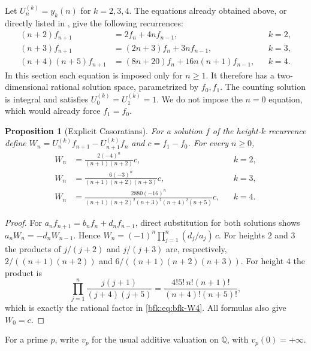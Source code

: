 \documentclass[11pt,a4paper]{article}
\newtheorem{proposition}[theorem]{Proposition}
\theoremstyle{definition}
\theoremstyle{remark}
\numberwithin{equation}{section}
\newcommand{\Q}{\mathbb{Q}}
\begin{document}
Let $U^{(k)}_n=y_k(n)$ for $k=2,3,4$. The equations already obtained above,
or directly listed in \cite{BG00}, give the following recurrences:
\begin{align}
 (n+2)f_{n+1}&=2f_n+4nf_{n-1}, && k=2,\label{bfk:eq:bfk-height2}\\
 (n+3)f_{n+1}&=(2n+3)f_n+3nf_{n-1}, && k=3,\label{bfk:eq:bfk-height3}\\
 (n+4)(n+5)f_{n+1}&=(8n+20)f_n+16n(n+1)f_{n-1},
 && k=4.\label{bfk:eq:bfk-height4}
\end{align}
In this section each equation is imposed only for $n\ge1$.
It therefore has a two-dimensional rational solution space, parametrized by
$f_0,f_1$. The counting solution is integral and satisfies
$U^{(k)}_0=U^{(k)}_1=1$. We do not impose the $n=0$ equation, which would
already force $f_1=f_0$.

\begin{proposition}[Explicit Casoratians]\label{bfk:prop:bfk-casoratians}
For a solution $f$ of the height-$k$ recurrence define
$W_n=U^{(k)}_nf_{n+1}-U^{(k)}_{n+1}f_n$ and $c=f_1-f_0$.
For every $n\ge0$,
\begin{align}
 W_n&=\frac{2(-4)^n}{(n+1)(n+2)}c, && k=2,\label{bfk:eq:bfk-W2}\\
 W_n&=\frac{6(-3)^n}{(n+1)(n+2)(n+3)}c, && k=3,\label{bfk:eq:bfk-W3}\\
 W_n&=\frac{2880(-16)^n}{(n+1)(n+2)^2(n+3)^2(n+4)^2(n+5)}c,
 && k=4.\label{bfk:eq:bfk-W4}
\end{align}
\end{proposition}
\begin{proof}
For $a_nf_{n+1}=b_nf_n+d_nf_{n-1}$, direct substitution for both solutions
shows $a_nW_n=-d_nW_{n-1}$. Hence
$W_n=(-1)^n\prod_{j=1}^n(d_j/a_j)\,c$.
For heights $2$ and $3$ the products of $j/(j+2)$ and $j/(j+3)$
are, respectively, $2/((n+1)(n+2))$ and
$6/((n+1)(n+2)(n+3))$.
For height $4$ the product is
\[
 \prod_{j=1}^n\frac{j(j+1)}{(j+4)(j+5)}
 =\frac{4!5!\,n!(n+1)!}{(n+4)!(n+5)!},
\]
which is exactly the rational factor in \eqref{bfk:eq:bfk-W4}.
All formulas also give $W_0=c$.
\end{proof}

For a prime $p$, write $v_p$ for the usual additive valuation on
$\Q$, with $v_p(0)=+\infty$.
\end{document}
